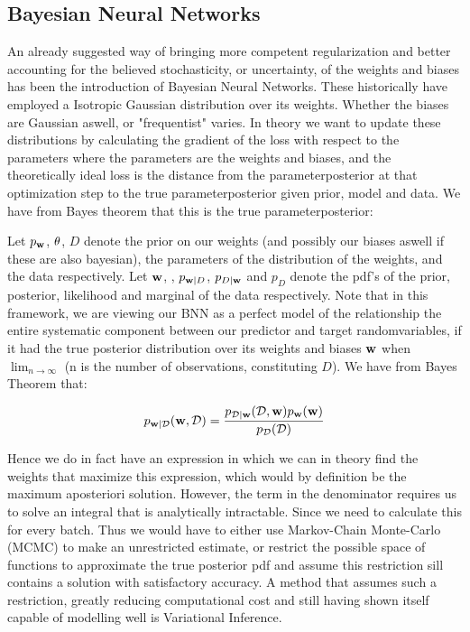 \documentclass[nofootinbib,UKenglish,nobalancelastpage,12pt]{article}
\newcommand{\vect}{\ensuremath{\mathbf}}
\begin{document}
\subsection{Bayesian Neural Networks}

An already suggested way of bringing more competent regularization and better accounting for the believed stochasticity, or uncertainty, of the weights and biases has been the introduction of Bayesian Neural Networks. These historically have employed a Isotropic Gaussian distribution over its weights. Whether the biases are Gaussian aswell, or "frequentist" varies. In theory we want to update these distributions by calculating the gradient of the loss with respect to the parameters where the parameters are the weights and biases, and the theoretically ideal loss is the distance from the parameterposterior at that optimization step to the true parameterposterior given prior, model and data. We have from Bayes theorem that this is the true parameterposterior:

Let $p_{\vect{w}}$, $\vect{\theta}$, $D$ denote the prior on our weights (and possibly our biases aswell if these are also bayesian), the parameters of the distribution of the weights, and the data respectively. Let $\vect{w}$, , $p_{\vect{w}|D}$, $p_{D|\vect{w}}$ and $p_{D}$ denote the pdf's of the prior, posterior, likelihood and marginal of the data respectively. Note that in this framework, we are viewing our BNN as a perfect model of the relationship the entire systematic component between our predictor and target randomvariables, if it had the true posterior distribution over its weights and biases $\vect{w}$ when $\lim_{n \to \infty}$ (n is the number of observations, constituting $D$). We have from Bayes Theorem that:


$$
p_{\vect{w}|\mathcal{D}}(\vect{w}, \mathcal{D}) = \frac{p_{\mathcal{D}|\vect{w}}( \mathcal{D},\vect{w})p_{\vect{w}}(\vect{w})}{p_{\mathcal{D}}(\mathcal{D})}
$$

Hence we do in fact have an expression in which we can in theory find the weights that maximize this expression, which would by definition be the maximum aposteriori solution. However, the term in the denominator requires us to solve an integral that is analytically intractable. Since we need to calculate this for every batch. Thus we would have to either use Markov-Chain Monte-Carlo (MCMC) to make an unrestricted estimate, or restrict the possible space of functions to approximate the true posterior pdf and assume this restriction sill contains a solution with satisfactory accuracy. A method that assumes such a restriction, greatly reducing computational cost and still having shown itself capable of modelling well is Variational Inference.
\end{document}
